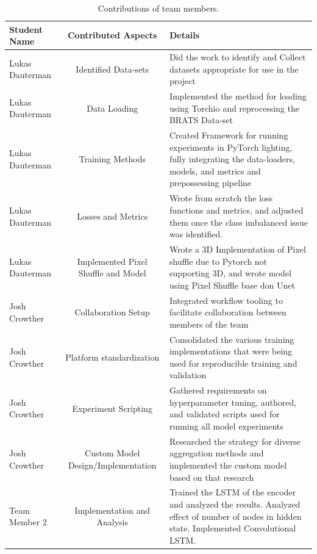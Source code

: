 \documentclass[10pt,twocolumn,letterpaper]{article}
\begin{document}
\begin{table}
\begin{center}
\begin{tabular}{|l|c|p{8cm}|}
\hline
Student Name & Contributed Aspects & Details \\
\hline\hline

Lukas Dauterman & Identified Data-sets & Did the work to identify and Collect datasets appropriate for use in the project \\
Lukas Dauterman & Data Loading & Implemented the method for loading using Torchio and reprocessing the BRATS Data-set \\
Lukas Dauterman & Training Methods & Created Framework for running experiments in  PyTorch lighting, fully integrating the data-loaders, models, and metrics and prepossessing pipeline \\
Lukas Dauterman & Losses and Metrics & Wrote from scratch the loss functions and metrics, and adjusted them once the class imbalanced issue was identified. \\
Lukas Dauterman & Implemented Pixel Shuffle and Model & Wrote a 3D Implementation of Pixel shuffle due to Pytorch not supporting 3D, and wrote model using Pixel Shuffle base don Unet \\

Josh Crowther & Collaboration Setup & Integrated workflow tooling to facilitate collaboration between members of the team \\
Josh Crowther & Platform standardization & Consolidated the various training implementations that were being used for reproducible training and validation \\
Josh Crowther & Experiment Scripting & Gathered requirements on hyperparameter tuning, authored, and validated scripts used for running all model experiments \\
Josh Crowther & Custom Model Design/Implementation & Researched the strategy for diverse aggregation methods and implemented the custom model based on that research \\



Team Member 2 & Implementation and Analysis & Trained the LSTM of the encoder and analyzed the results. Analyzed effect of number of nodes in hidden state.  Implemented Convolutional LSTM. \\
\hline
\end{tabular}
\end{center}
\caption{Contributions of team members.}
\label{tab:contributions}
\end{table}
\end{document}
